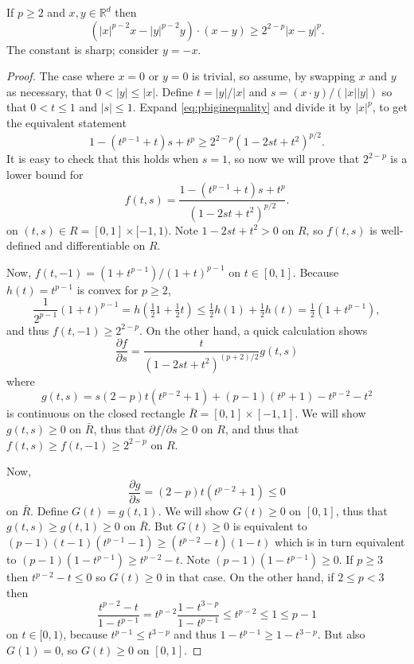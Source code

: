 \documentclass[final,onefignum]{siamart190516}
\newcommand\RR{\mathbb{R}}
\begin{document}
\begin{lemma}  \label{lem:pbiginequality}  If $p\ge 2$ and $x,y\in\RR^d$ then
\begin{equation}
\left(|x|^{p-2} x - |y|^{p-2} y\right)\cdot(x-y) \ge 2^{2-p} |x-y|^p. \label{eq:pbiginequality}
\end{equation}
The constant is sharp; consider $y=-x$.
\end{lemma}

\begin{proof}  The case where $x=0$ or $y=0$ is trivial, so assume, by swapping $x$ and $y$ as necessary, that $0 < |y| \le |x|$.  Define $t=|y|/|x|$ and $s = (x\cdot y)/(|x||y|)$ so that $0 < t \le 1$ and $|s|\le 1$.  Expand \eqref{eq:pbiginequality} and divide it by $|x|^p$, to get the equivalent statement
    $$1 - (t^{p-1}+t) s + t^p \ge 2^{2-p} \left(1 - 2 s t + t^2\right)^{p/2}.$$
It is easy to check that this holds when $s=1$, so now we will prove that $2^{2-p}$ is a lower bound for
	$$f(t,s) = \frac{1 - (t^{p-1}+t) s + t^p}{\left(1 - 2 s t + t^2\right)^{p/2}}.$$
on $(t,s) \in R=[0,1]\times[-1,1)$.  Note $1-2st+t^2 > 0$ on $ R$, so $f(t,s)$ is well-defined and differentiable on $R$.

Now, $f(t,-1) = \left(1 + t^{p-1}\right) / \left(1 + t\right)^{p-1}$ on $t\in[0,1]$.  Because $h(t)=t^{p-1}$ is convex for $p \ge 2$,
    $$\frac{1}{2^{p-1}} (1+t)^{p-1} = h(\tfrac{1}{2} 1 + \tfrac{1}{2} t) \le \tfrac{1}{2} h(1) + \tfrac{1}{2} h(t) = \tfrac{1}{2} (1 + t^{p-1}),$$
and thus $f(t,-1) \ge 2^{2-p}$.  On the other hand, a quick calculation shows
    $$\frac{\partial f}{\partial s} = \frac{t}{\left(1 - 2 s t + t^2\right)^{(p+2)/2}} g(t,s)$$
where
    $$g(t,s) = s(2-p) t (t^{p-2} + 1) + (p-1) (t^p+1) - t^{p-2} - t^2$$
is continuous on the closed rectangle $\bar R = [0,1]\times[-1,1]$.  We will show $g(t,s)\ge 0$ on $\bar R$, thus that $\partial f/\partial s \ge 0$ on $R$, and thus that $f(t,s)\ge f(t,-1) \ge  2^{2-p}$ on $R$.

Now,
    $$\frac{\partial g}{\partial s} = (2-p) t (t^{p-2} + 1) \le 0$$
on $\bar R$.  Define $G(t) = g(t,1)$.  We will show $G(t)\ge 0$ on $[0,1]$, thus that $g(t,s)\ge g(t,1)\ge 0$ on $\bar R$.  But $G(t)\ge 0$ is equivalent to $(p-1) (t-1) (t^{p-1}-1) \ge (t^{p-2} - t) (1 - t)$ which is in turn equivalent to $(p-1) (1 - t^{p-1}) \ge t^{p-2} - t$.  Note $(p-1) (1 - t^{p-1}) \ge 0$.  If $p\ge 3$ then $t^{p-2} - t \le 0$ so $G(t)\ge 0$ in that case.  On the other hand, if $2\le p < 3$ then
	$$\frac{t^{p-2} - t}{1 - t^{p-1}} = t^{p-2} \frac{1 - t^{3-p}}{1 - t^{p-1}} \le t^{p-2} \le 1 \le p-1$$
on $t\in[0,1)$, because $t^{p-1}\le t^{3-p}$ and thus $1 - t^{p-1} \ge 1 - t^{3-p}$.  But also $G(1)=0$, so $G(t)\ge 0$ on $[0,1]$. \end{proof}
\end{document}
